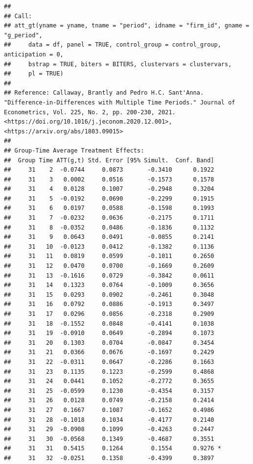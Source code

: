 \documentclass[
]{article}
\begin{document}
\begin{verbatim}
## 
## Call:
## att_gt(yname = yname, tname = "period", idname = "firm_id", gname = "g_period", 
##     data = df, panel = TRUE, control_group = control_group, anticipation = 0, 
##     bstrap = TRUE, biters = BITERS, clustervars = clustervars, 
##     pl = TRUE)
## 
## Reference: Callaway, Brantly and Pedro H.C. Sant'Anna.  "Difference-in-Differences with Multiple Time Periods." Journal of Econometrics, Vol. 225, No. 2, pp. 200-230, 2021. <https://doi.org/10.1016/j.jeconom.2020.12.001>, <https://arxiv.org/abs/1803.09015> 
## 
## Group-Time Average Treatment Effects:
##  Group Time ATT(g,t) Std. Error [95% Simult.  Conf. Band]  
##     31    2  -0.0744     0.0873       -0.3410      0.1922  
##     31    3   0.0002     0.0516       -0.1573      0.1578  
##     31    4   0.0128     0.1007       -0.2948      0.3204  
##     31    5  -0.0192     0.0690       -0.2299      0.1915  
##     31    6   0.0197     0.0588       -0.1598      0.1993  
##     31    7  -0.0232     0.0636       -0.2175      0.1711  
##     31    8  -0.0352     0.0486       -0.1836      0.1132  
##     31    9   0.0643     0.0491       -0.0855      0.2141  
##     31   10  -0.0123     0.0412       -0.1382      0.1136  
##     31   11   0.0819     0.0599       -0.1011      0.2650  
##     31   12   0.0470     0.0700       -0.1669      0.2609  
##     31   13  -0.1616     0.0729       -0.3842      0.0611  
##     31   14   0.1323     0.0764       -0.1009      0.3656  
##     31   15   0.0293     0.0902       -0.2461      0.3048  
##     31   16   0.0792     0.0886       -0.1913      0.3497  
##     31   17   0.0296     0.0856       -0.2318      0.2909  
##     31   18  -0.1552     0.0848       -0.4141      0.1038  
##     31   19  -0.0910     0.0649       -0.2894      0.1073  
##     31   20   0.1303     0.0704       -0.0847      0.3454  
##     31   21   0.0366     0.0676       -0.1697      0.2429  
##     31   22  -0.0311     0.0647       -0.2286      0.1663  
##     31   23   0.1135     0.1223       -0.2599      0.4868  
##     31   24   0.0441     0.1052       -0.2772      0.3655  
##     31   25  -0.0599     0.1230       -0.4354      0.3157  
##     31   26   0.0128     0.0749       -0.2158      0.2414  
##     31   27   0.1667     0.1087       -0.1652      0.4986  
##     31   28  -0.1018     0.1034       -0.4177      0.2140  
##     31   29  -0.0908     0.1099       -0.4263      0.2447  
##     31   30  -0.0568     0.1349       -0.4687      0.3551  
##     31   31   0.5415     0.1264        0.1554      0.9276 *
##     31   32  -0.0251     0.1358       -0.4399      0.3897  

\end{verbatim}
\end{document}
